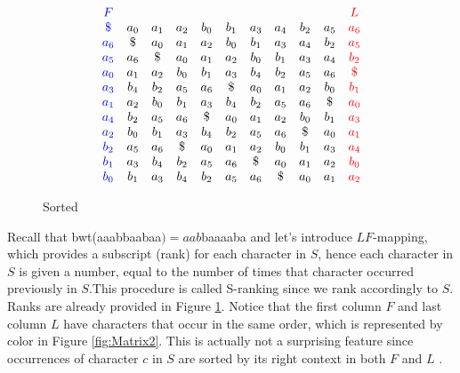 \documentclass[12pt]{article} %
\begin{document}
\begin{figure}[H]
\[
\begin{array}{*{11}c}
{\color{blue} F } &  &  & & & & & & & & {\color{red} L }  \\ 
{\color{blue} \$ } & a_0 & a_1 & a_2 & b_0 & b_1 & a_3 & a_4 & b_2 & a_5 & {\color{red} a_6 } \\
{\color{blue} a_6 } & \$ & a_0 & a_1 & a_2 & b_0 & b_1 & a_3 & a_4 & b_2 & {\color{red} a_5 }  \\
{\color{blue} a_5 } & a_6 & \$ & a_0 & a_1 & a_2 & b_0 & b_1 & a_3 & a_4 & {\color{red} b_2 } \\
{\color{blue} a_0 } & a_1 & a_2 & b_0 & b_1 & a_3 & b_4 & b_2 & a_5 & a_6 & {\color{red} \$ } \\
{\color{blue} a_3 }  & b_4 & b_2 & a_5 & a_6 & \$ & a_0 & a_1 & a_2 & b_0 & {\color{red} b_1 } \\
{\color{blue} a_1 } & a_2 & b_0 & b_1 & a_3 & b_4 & b_2 & a_5 & a_6 & \$ & {\color{red} a_0 }  \\
{\color{blue} a_4 }  & b_2 & a_5 & a_6 & \$ & a_0 & a_1 & a_2 & b_0 & b_1 & {\color{red} a_3 } \\
{\color{blue} a_2 } & b_0 & b_1 & a_3 & b_4 & b_2 & a_5 & a_6 & \$ & a_0 & {\color{red} a_1 } \\
{\color{blue} b_2  } & a_5 & a_6 & \$ & a_0 & a_1 & a_2 & b_0 & b_1 & a_3 & {\color{red} a_4 } \\
{\color{blue} b_1 }  & a_3 & b_4 & b_2 & a_5 & a_6 & \$ & a_0 & a_1 & a_2 & {\color{red} b_0 }  \\ 
{\color{blue} b_0 }  & b_1 & a_3 & b_4 & b_2 & a_5 & a_6 & \$ & a_0 & a_1 & {\color{red} a_2 } \\
\end{array}
\]
\captionsetup{width=0.8\textwidth}
\caption{Sorted}
\label{fig:Matrix1}
\end{figure}

Recall that bwt(aaabbaabaa$) = aab$baaaaba and let's introduce $LF$-mapping, which provides a subscript (rank) for each character in $S$, hence each character in $S$ is given a number, equal to the number of times that character occurred previously in $S$.This procedure is called S-ranking since we rank accordingly to $S$. Ranks are already provided in Figure  \ref{fig:Matrix1}. Notice that the first column $F$ and last column $L$ have characters that occur in the same order, which is represented by color in Figure \ref{fig:Matrix2}. This is actually not a surprising feature since occurrences of character $c$ in $S$ are sorted by its right context in both $F$ and $L$ \cite{bwtfmindex}.
\end{document}
